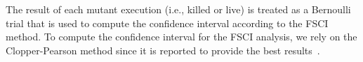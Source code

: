 { The result of each mutant execution (i.e., killed or live) is treated as a Bernoulli trial that is used to compute the confidence interval according to the FSCI method.
To compute the confidence interval for the FSCI analysis, we rely on the Clopper-Pearson method since it is reported to provide the best results~\cite{ClopperPearson}.
%
%
}
